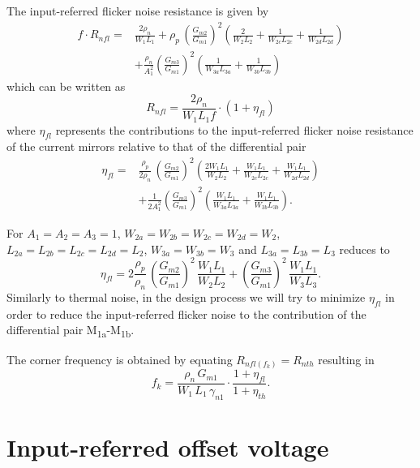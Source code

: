 \documentclass[
  a4paper,
  DIV=11,
  numbers=noendperiod]{scrreprt}
\begin{document}
The input-referred flicker noise resistance is given by \begin{align}
  f \cdot R_{nfl} =& \frac{2 \rho_n}{W_1 L_1} + \rho_p\,\left(\frac{G_{m2}}{G_{m1}}\right)^2 \left(\frac{2}{W_2 L_2}+\frac{1}{W_{2c} L_{2c}}+\frac{1}{W_{2d} L_{2d}}\right)\\
  &+ \frac{\rho_n}{A_1^2}\left(\frac{G_{m3}}{G_{m1}}\right)^2\left(\frac{1}{W_{3a} L_{3a}}+\frac{1}{W_{3b} L_{3b}}\right)
\end{align} which can be written as \begin{equation}
  R_{nfl} = \frac{2 \rho_n}{W_1 L_1 f} \cdot (1 + \eta_{fl})
\end{equation} where \(\eta_{fl}\) represents the contributions to the
input-referred flicker noise resistance of the current mirrors relative
to that of the differential pair \begin{align}
  \eta_{fl} =& \frac{\rho_p}{2\rho_n}\,\left(\frac{G_{m2}}{G_{m1}}\right)^2 \left(\frac{2 W_1 L_1}{W_2 L_2}+\frac{W_1 L_1}{W_{2c} L_{2c}}+\frac{W_1 L_1}{W_{2d} L_{2d}}\right)\\
  &+ \frac{1}{2 A_1^2}\left(\frac{G_{m3}}{G_{m1}}\right)^2\left(\frac{W_1 L_1}{W_{3a} L_{3a}}+\frac{W_1 L_1}{W_{3b} L_{3b}}\right).
\end{align}

For \(A_1=A_2=A_3=1\), \(W_{2a}=W_{2b}=W_{2c}=W_{2d}=W_2\),
\(L_{2a}=L_{2b}=L_{2c}=L_{2d}=L_2\), \(W_{3a}=W_{3b}=W_3\) and
\(L_{3a}=L_{3b}=L_3\) reduces to \begin{equation}
  \eta_{fl} = 2\frac{\rho_p}{\rho_n}\,\left(\frac{G_{m2}}{G_{m1}}\right)^2\,\frac{W_1 L_1}{W_2 L_2} + \left(\frac{G_{m3}}{G_{m1}}\right)^2\,\frac{W_1 L_1}{W_3 L_3}.
\end{equation} Similarly to thermal noise, in the design process we will
try to minimize \(\eta_{fl}\) in order to reduce the input-referred
flicker noise to the contribution of the differential pair
M\textsubscript{1a}-M\textsubscript{1b}.

The corner frequency is obtained by equating \(R_{nfl(f_k)} = R_{nth}\)
resulting in \begin{equation}
  f_k = \frac{\rho_n\,G_{m1}}{W_1\,L_1\,\gamma_{n1}} \cdot \frac{1+\eta_{fl}}{1+\eta_{th}}.
\end{equation}

\section{Input-referred offset
voltage}\label{input-referred-offset-voltage}
\end{document}
